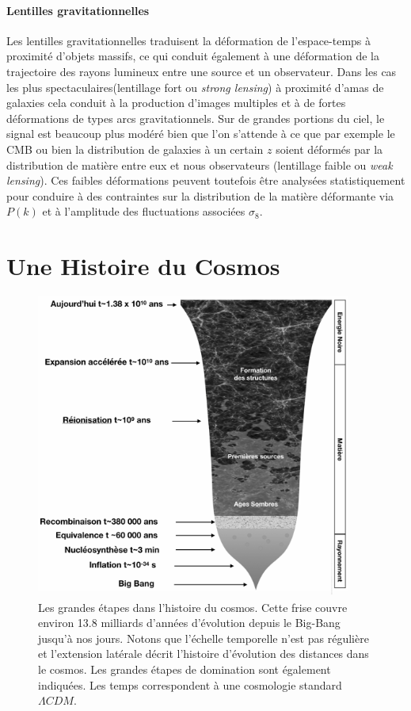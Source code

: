 \paragraph{Lentilles gravitationnelles}
Les lentilles gravitationnelles traduisent la déformation de l'espace-temps à proximité d'objets massifs, ce qui conduit également à une déformation de la trajectoire des rayons lumineux entre une source et un observateur. Dans les cas les plus spectaculaires(lentillage fort ou \textit{strong lensing}) à proximité d'amas de galaxies  cela conduit à la production d'images multiples et à de fortes déformations de types arcs gravitationnels. Sur de grandes portions du ciel, le signal est beaucoup plus modéré bien que l'on s'attende à ce que par exemple le CMB ou bien la distribution de galaxies à un certain $z$ soient déformés par la distribution de matière entre eux et nous observateurs (lentillage faible ou \textit{weak lensing}). Ces faibles déformations peuvent toutefois être analysées statistiquement pour conduire à des contraintes sur la distribution de la matière déformante via $P(k)$ et à l'amplitude des fluctuations associées $\sigma_8$.

\section{Une Histoire du Cosmos}
\begin{figure}[htbp]
	\centering
		\includegraphics[height=10cm]{figs/timeline.png}
		\caption[Les grandes étapes dans l'histoire du cosmos]{Les grandes étapes dans l'histoire du cosmos. Cette frise couvre environ 13.8 milliards d'années d'évolution depuis le Big-Bang  jusqu'à nos jours. Notons que l'échelle temporelle n'est pas régulière et l'extension latérale décrit l'histoire d'évolution des distances dans le cosmos. Les grandes étapes de domination sont également indiquées. Les temps correspondent à une cosmologie standard $\Lambda CDM$.}
	\label{f:timeline}
\end{figure}

